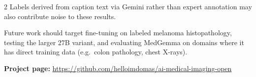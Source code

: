 \documentclass[a4paper,10pt]{article}
\begin{document}
\begin{multicols}{2}
\vspace{0.3em}
Labels derived from caption text via Gemini rather than expert annotation may also contribute noise to these results.

\vspace{0.3em}
Future work should target fine-tuning on labeled melanoma histopathology, testing the larger 27B variant, and evaluating MedGemma on domains where it has direct training data (e.g.\ colon pathology, chest X-rays).

\vspace{0.5em}
\noindent\textbf{Project page:} \url{https://github.com/helloimdomas/ai-medical-imaging-open}

\end{multicols}
\end{document}
